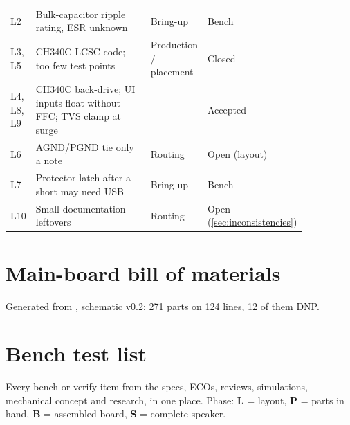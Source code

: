 {\begin{longtable}{@{}l >{\raggedright\arraybackslash}p{0.50\linewidth} >{\raggedright\arraybackslash}p{0.15\linewidth} >{\raggedright\arraybackslash}p{0.20\linewidth}@{}}
L2 & Bulk-capacitor ripple rating, ESR unknown & Bring-up & Bench \\
L3, L5 & CH340C LCSC code; too few test points & Production / placement & Closed \\
L4, L8, L9 & CH340C back-drive; UI inputs float without FFC; TVS clamp at surge & --- & Accepted \\
L6 & AGND/PGND tie only a note & Routing & Open (layout) \\
L7 & Protector latch after a short may need USB & Bring-up & Bench \\
L10 & Small documentation leftovers & Routing & Open (\cref{sec:inconsistencies}) \\
\end{longtable}
}

\clearpage
\section{Main-board bill of materials}\label{app:bom}
Generated from , schematic v0.2: 271 parts on 124 lines, 12 of them DNP.



\clearpage
\section{Bench test list}\label{sec:bench}

Every bench or verify item from the specs, ECOs, reviews, simulations, mechanical concept and research, in one place. Phase: \textbf{L} = layout, \textbf{P} = parts in hand, \textbf{B} = assembled board, \textbf{S} = complete speaker.

